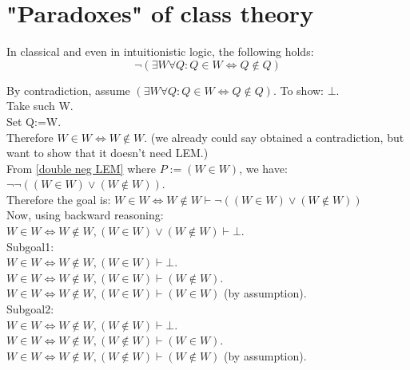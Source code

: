 \def\topic{}


\section{"Paradoxes" of class theory}



\begin{theorem}
\label{Russel's Paradox}
In classical and even in intuitionistic logic, the following holds:
\[
\neg (\exists W \forall Q: Q\in W \iff Q\notin Q)
\]
\end{theorem}
\Proof
\noindent By contradiction, assume $(\exists W \forall Q: Q\in W \iff Q\notin Q)$. To show: $\bot$.\\
Take such W.\\
Set Q:=W.\\
Therefore $W\in W \iff W\notin W.$ (we already could say obtained a contradiction, but want to show that it doesn't need LEM.)\\
From \ref{double neg LEM} where $P:=(W\in W)$, we have:
$\neg\neg((W\in W)\lor(W\notin W))$.\\
Therefore the goal is:
$W\in W \iff W\notin W \vdash \neg((W\in W)\lor(W\notin W))$\\
Now, using backward reasoning:\\
$W\in W \iff W\notin W, (W\in W)\lor(W\notin W) \vdash \bot$.\\
Subgoal1:\\
$W\in W \iff W\notin W, (W\in W) \vdash \bot$.\\
$W\in W \iff W\notin W, (W\in W) \vdash (W\notin W)$.\\
$W\in W \iff W\notin W, (W\in W) \vdash (W\in W)$ (by assumption).\\
Subgoal2:\\
$W\in W \iff W\notin W, (W\notin W) \vdash \bot$.\\
$W\in W \iff W\notin W, (W\notin W) \vdash (W\in W)$.\\
$W\in W \iff W\notin W, (W\notin W) \vdash (W\notin W)$ (by assumption).\\
\Done



